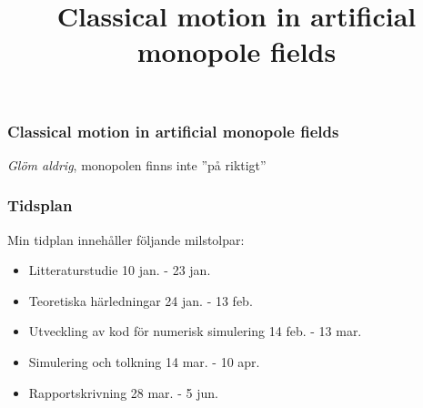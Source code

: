 \documentclass{beamer}
\title{Classical motion in artificial monopole fields}
\begin{document}
\begin{frame}
        \frametitle{\textbf{Classical motion in artificial monopole fields}}
        \centering
        \emph{Glöm aldrig}, \newline
        monopolen finns inte ''på riktigt''
\end{frame}
\begin{frame}

\frametitle{Tidsplan}
Min tidplan innehåller följande milstolpar:
\begin{itemize}
        \item Litteraturstudie 10 jan. - 23 jan.
        \item Teoretiska härledningar 24 jan. - 13 feb.
        \item Utveckling av kod för numerisk simulering 14 feb. - 13 mar.
        \item Simulering och tolkning 14 mar. - 10 apr.
        \item Rapportskrivning 28 mar. - 5 jun.
\end{itemize}
\end{frame}
\end{document}
